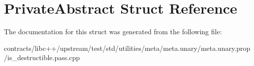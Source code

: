 \hypertarget{struct_private_abstract}{}\section{Private\+Abstract Struct Reference}
\label{struct_private_abstract}


The documentation for this struct was generated from the following file\+:\begin{DoxyCompactItemize}
\item 
contracts/libc++/upstream/test/std/utilities/meta/meta.\+unary/meta.\+unary.\+prop/is\+\_\+destructible.\+pass.\+cpp\end{DoxyCompactItemize}
